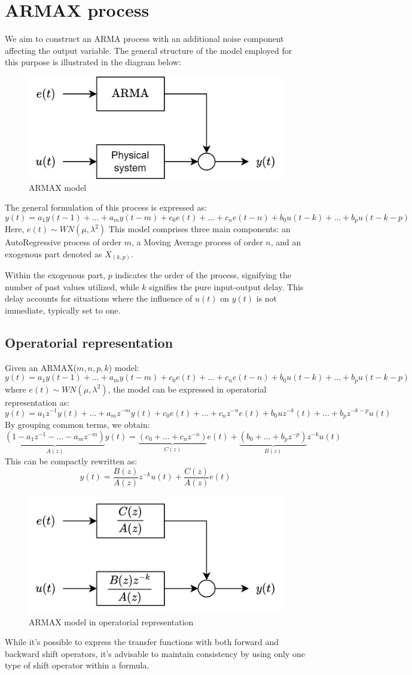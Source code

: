 \section{ARMAX process}

We aim to construct an ARMA process with an additional noise component affecting the output variable. 
The general structure of the model employed for this purpose is illustrated in the diagram below:
\begin{figure}[H]
    \centering
    \includegraphics[width=0.5\linewidth]{images/armax.png}
    \caption{ARMAX model}
\end{figure}
The general formulation of this process is expressed as:
\[y(t)=a_1y(t-1)+\dots+a_m y(t-m)+c_0e(t)+\dots+c_n e(t-n)+b_0u(t-k)+\dots+b_p u(t-k-p)\] 
Here, $e(t)\sim WN(\mu,\lambda^2)$
This model comprises three main components: an AutoRegressive process of order $m$, a Moving Average process of order $n$, and an exogenous part denoted as $X_{(k,p)}$.

Within the exogenous part, $p$ indicates the order of the process, signifying the number of past values utilized, while $k$ signifies the pure input-output delay. 
This delay accounts for situations where the influence of $u(t)$ on $y(t)$ is not immediate, typically set to one.

\subsection{Operatorial representation}
Given an ARMAX($m,n,p,k$) model:
\[y(t)=a_1y(t-1)+\dots+a_m y(t-m)+c_0e(t)+\dots+c_n e(t-n)+b_0u(t-k)+\dots+b_p u(t-k-p)\] 
where $e(t)\sim WN(\mu,\lambda^2)$, the model can be expressed in operatorial representation as:
\[y(t)=a_1z^{-1}y(t)+\dots+a_m z^{-m}y(t)+c_0e(t)+\dots+c_n z^{-n}e(t)+b_0uz^{-k}(t)+\dots+b_p z^{-k-p}u(t)\]
By grouping common terms, we obtain:
\[\underbrace{\left(1-a_1z^{-1}-\dots-a_m z^{-m}\right)}_{A(z)} y(t)=\underbrace{\left(c_0+\dots+c_n z^{-n}\right)}_{C(z)} e(t)+\underbrace{\left(b_0+\dots+b_p z^{-p}\right)}_{B(z)} z^{-k}u(t)\]
This can be compactly rewritten as:
\[y(t)=\dfrac{B(z)}{A(z)}z^{-k}u(t)+\dfrac{C(z)}{A(z)}e(t)\]
\begin{figure}[H]
    \centering
    \includegraphics[width=0.5\linewidth]{images/armaxblock.png}
    \caption{ARMAX model in operatorial representation}
\end{figure}
While it's possible to express the transfer functions with both forward and backward shift operators, it's advisable to maintain consistency by using only one type of shift operator within a formula.